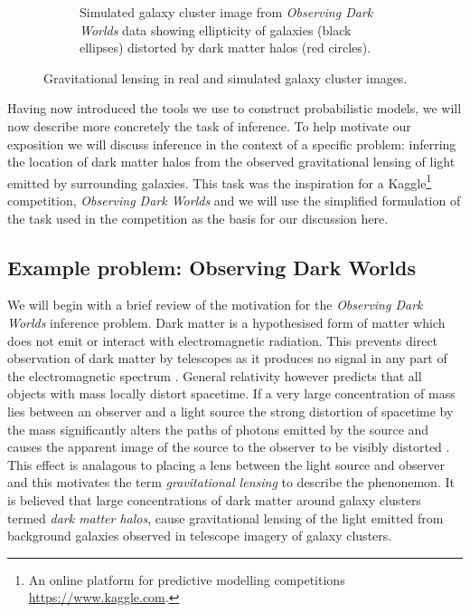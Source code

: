 \begin{figure}[!t]
\begin{subfigure}[b]{.46\linewidth}
\vskip 0pt
\caption{Simulated galaxy cluster image from \emph{Observing Dark Worlds} data \citep{kaggle2012observing} showing ellipticity of galaxies (black ellipses) distorted by dark matter halos (red circles).}
\label{sfig:gravitational-lensing-simulated}
\end{subfigure}%
\caption[Examples of gravitational lensing.]{Gravitational lensing in real and simulated galaxy cluster images.}
\label{fig:gravitational-lensing}
\end{figure}

Having now introduced the tools we use to construct probabilistic models, we will now describe more concretely the task of inference. To help motivate our exposition we will discuss inference in the context of a specific problem: inferring the location of dark matter halos from the observed gravitational lensing of light emitted by surrounding galaxies. This task was the inspiration for a Kaggle\footnote{An online platform for predictive modelling competitions \url{https://www.kaggle.com}.} competition, \emph{Observing Dark Worlds} \citep{kaggle2012observing,harvey2014observing} and we will use the simplified formulation of the task used in the competition as the basis for our discussion here.%

\subsection{Example problem: Observing Dark Worlds}

We will begin with a brief review of the motivation for the \emph{Observing Dark Worlds} inference problem. Dark matter is a hypothesised form of matter which does not emit or interact with electromagnetic radiation.  This prevents direct observation of dark matter by telescopes as it produces no signal in any part of the electromagnetic spectrum \citep{massey2010dark}. General relativity however predicts that all objects with mass locally distort spacetime. If a very large concentration of mass lies between an observer and a light source the strong distortion of spacetime by the mass significantly alters the paths of photons emitted by the source and causes the apparent image of the source to the observer to be visibly distorted \citep{bartelmann2001weak}. This effect is analagous to placing a lens between the light source and observer and this motivates the term \emph{gravitational lensing} to describe the phenonemon. It is believed that large concentrations of dark matter around galaxy clusters termed \emph{dark matter halos}, cause gravitational lensing of the light emitted from background galaxies observed in telescope imagery of galaxy clusters. %

